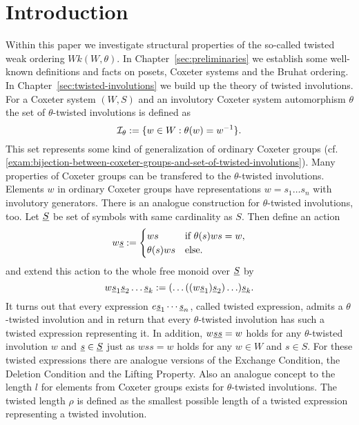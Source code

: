 \chapter*{Introduction}
\label{sec:introduction}

Within this paper we investigate structural properties of the so-called twisted weak ordering $Wk(W,\theta)$. In Chapter~\ref{sec:preliminaries} we establish some well-known definitions and facts on posets, Coxeter systems and the Bruhat ordering. In Chapter~\ref{sec:twisted-involutions} we build up the theory of twisted involutions. For a Coxeter system $(W,S)$ and an involutory Coxeter system automorphism $\theta$ the set of $\theta$-twisted involutions is defined as
$$ \mathcal{I}_{\theta} := \{ w \in W : \theta(w) = w^{-1} \}. $$
This set represents some kind of generalization of ordinary Coxeter groups (cf. \ref{exam:bijection-between-coxeter-groups-and-set-of-twisted-involutions}). Many properties of Coxeter groups can be transfered to the $\theta$-twisted involutions. Elements $w$ in ordinary Coxeter groups have representations $w = s_1 \ldots s_n$ with involutory generators. There is an analogue construction for $\theta$-twisted involutions, too. Let $\underline{S}$ be set of symbols with same cardinality as $S$. Then define an action
$$ w \underline{s} := \begin{cases}
	ws & \textrm{if } \theta(s)ws = w, \\
	\theta(s)ws & \textrm{else}. \\
\end{cases} $$
and extend this action to the whole free monoid over $\underline{S}$ by
$$w \underline{s}_1 \underline{s}_2 \ldots \underline{s}_k := (\ldots ((w \underline{s}_1) \underline{s}_2) \ldots) \underline{s}_k. $$
It turns out that every expression $e \underline{s}_1 \cdots \underline{s}_n$, called twisted expression, admits a $\theta$-twisted involution and in return that every $\theta$-twisted involution has such a twisted expression representing it. In addition, $w \underline{s} \underline{s} = w$ holds for any $\theta$-twisted involution $w$ and $\underline{s} \in \underline{S}$ just as $w s s = w$ holds for any $w \in W$ and $s \in S$. For these twisted expressions there are analogue versions of the Exchange Condition, the Deletion Condition and the Lifting Property. Also an analogue concept to the length $l$ for elements from Coxeter groups exists for $\theta$-twisted involutions. The twisted length $\rho$ is defined as the smallest possible length of a twisted expression representing a twisted involution.

